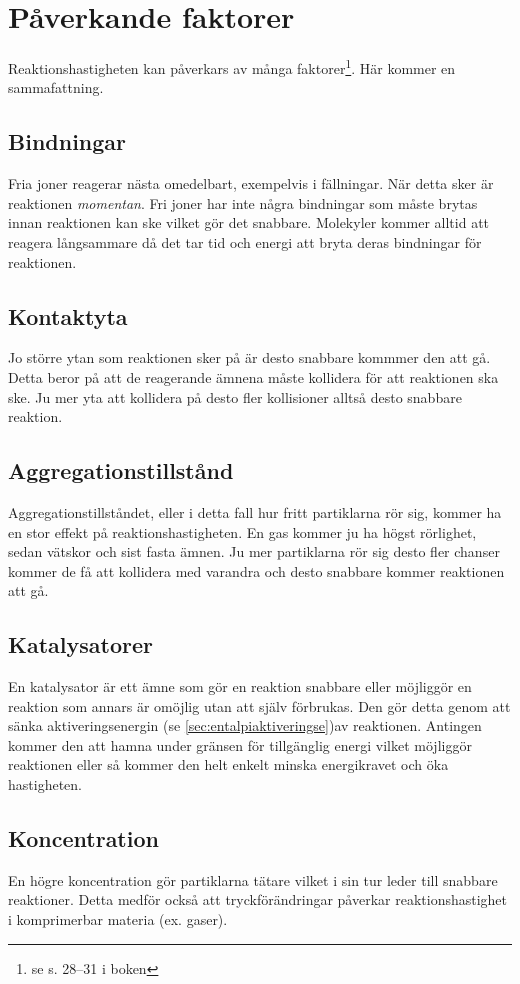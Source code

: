 \section{Påverkande faktorer}
Reaktionshastigheten kan påverkars av många faktorer\footnote{se s. 28--31 i boken}. Här kommer en sammafattning.
\subsection{Bindningar}
Fria joner reagerar nästa omedelbart, exempelvis i fällningar. När detta sker är reaktionen \emph{momentan}. Fri joner har inte några bindningar som måste brytas innan reaktionen kan ske vilket gör det snabbare. Molekyler kommer alltid att reagera långsammare då det tar tid och energi att bryta deras bindningar för reaktionen.

\subsection{Kontaktyta}
Jo större ytan som reaktionen sker på är desto snabbare kommmer den att gå. Detta beror på att de reagerande ämnena måste kollidera för att reaktionen ska ske. Ju mer yta att kollidera på desto fler kollisioner alltså desto snabbare reaktion.

\subsection{Aggregationstillstånd}
Aggregationstillståndet, eller i detta fall hur fritt partiklarna rör sig, kommer ha en stor effekt på reaktionshastigheten. En gas kommer ju ha högst rörlighet, sedan vätskor och sist fasta ämnen. Ju mer partiklarna rör sig desto fler chanser kommer de få att kollidera med varandra och desto snabbare kommer reaktionen att gå.

\subsection{Katalysatorer}
\label{sec:katalysator}
En katalysator är ett ämne som gör en reaktion snabbare eller möjliggör en reaktion som annars är omöjlig utan att själv förbrukas. Den gör detta genom att sänka aktiveringsenergin (se \vref{sec:entalpiaktiveringse})av reaktionen. Antingen kommer den att hamna under gränsen för tillgänglig energi vilket möjliggör reaktionen eller så kommer den helt enkelt minska energikravet och öka hastigheten.

\subsection{Koncentration}
En högre koncentration gör partiklarna tätare vilket i sin tur leder till snabbare reaktioner. Detta medför också att tryckförändringar påverkar reaktionshastighet i komprimerbar materia (ex. gaser).

